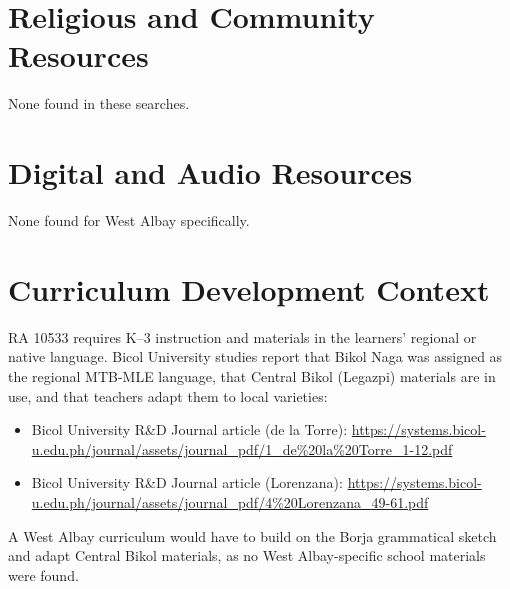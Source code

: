 \documentclass[12pt]{article}
\begin{document}
\section{Religious and Community Resources}
None found in these searches.

\section{Digital and Audio Resources}
None found for West Albay specifically.

\section{Curriculum Development Context}
RA 10533 requires K--3 instruction and materials in the learners' regional or native language. Bicol University studies report that Bikol Naga was assigned as the regional MTB-MLE language, that Central Bikol (Legazpi) materials are in use, and that teachers adapt them to local varieties:
\begin{itemize}
\item Bicol University R\&D Journal article (de la Torre): \url{https://systems.bicol-u.edu.ph/journal/assets/journal_pdf/1_de%20la%20Torre_1-12.pdf}
\item Bicol University R\&D Journal article (Lorenzana): \url{https://systems.bicol-u.edu.ph/journal/assets/journal_pdf/4%20Lorenzana_49-61.pdf}
\end{itemize}
A West Albay curriculum would have to build on the Borja grammatical sketch and adapt Central Bikol materials, as no West Albay-specific school materials were found.
\end{document}
